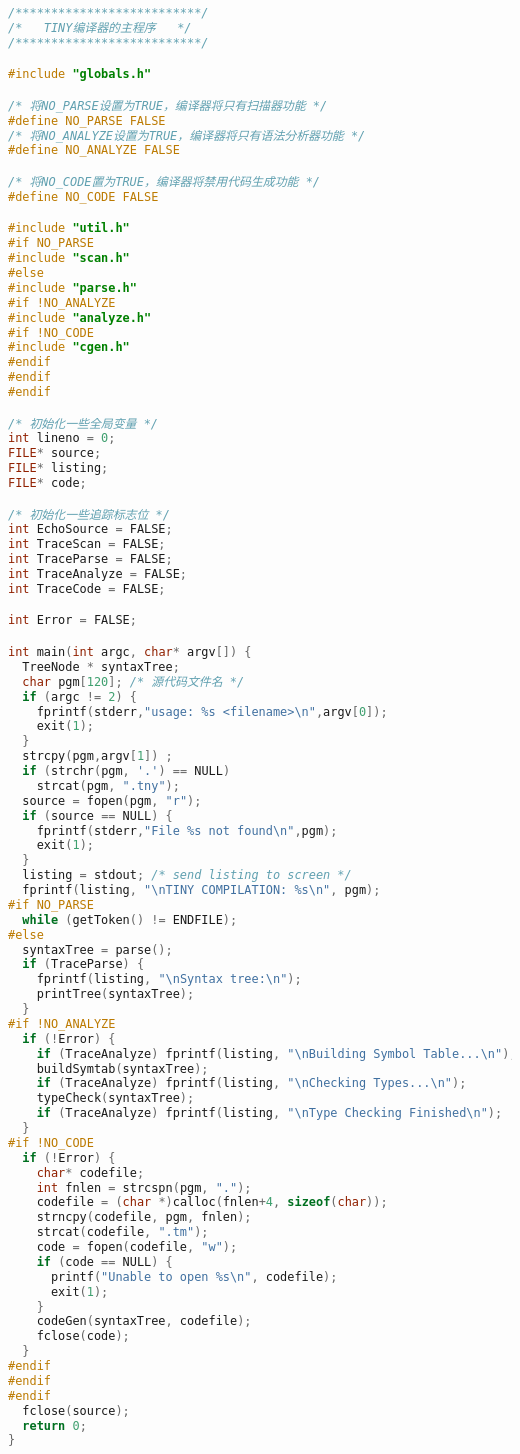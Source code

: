 \documentclass[lang=cn,10pt]{elegantbook}
\begin{document}
\begin{lstlisting}[caption={main.c},language=c]
/**************************/
/*   TINY编译器的主程序   */
/**************************/

#include "globals.h"

/* 将NO_PARSE设置为TRUE，编译器将只有扫描器功能 */
#define NO_PARSE FALSE
/* 将NO_ANALYZE设置为TRUE，编译器将只有语法分析器功能 */
#define NO_ANALYZE FALSE

/* 将NO_CODE置为TRUE，编译器将禁用代码生成功能 */
#define NO_CODE FALSE

#include "util.h"
#if NO_PARSE
#include "scan.h"
#else
#include "parse.h"
#if !NO_ANALYZE
#include "analyze.h"
#if !NO_CODE
#include "cgen.h"
#endif
#endif
#endif

/* 初始化一些全局变量 */
int lineno = 0;
FILE* source;
FILE* listing;
FILE* code;

/* 初始化一些追踪标志位 */
int EchoSource = FALSE;
int TraceScan = FALSE;
int TraceParse = FALSE;
int TraceAnalyze = FALSE;
int TraceCode = FALSE;

int Error = FALSE;

int main(int argc, char* argv[]) {
  TreeNode * syntaxTree;
  char pgm[120]; /* 源代码文件名 */
  if (argc != 2) {
    fprintf(stderr,"usage: %s <filename>\n",argv[0]);
    exit(1);
  }
  strcpy(pgm,argv[1]) ;
  if (strchr(pgm, '.') == NULL)
    strcat(pgm, ".tny");
  source = fopen(pgm, "r");
  if (source == NULL) {
    fprintf(stderr,"File %s not found\n",pgm);
    exit(1);
  }
  listing = stdout; /* send listing to screen */
  fprintf(listing, "\nTINY COMPILATION: %s\n", pgm);
#if NO_PARSE
  while (getToken() != ENDFILE);
#else
  syntaxTree = parse();
  if (TraceParse) {
    fprintf(listing, "\nSyntax tree:\n");
    printTree(syntaxTree);
  }
#if !NO_ANALYZE
  if (!Error) {
    if (TraceAnalyze) fprintf(listing, "\nBuilding Symbol Table...\n");
    buildSymtab(syntaxTree);
    if (TraceAnalyze) fprintf(listing, "\nChecking Types...\n");
    typeCheck(syntaxTree);
    if (TraceAnalyze) fprintf(listing, "\nType Checking Finished\n");
  }
#if !NO_CODE
  if (!Error) {
    char* codefile;
    int fnlen = strcspn(pgm, ".");
    codefile = (char *)calloc(fnlen+4, sizeof(char));
    strncpy(codefile, pgm, fnlen);
    strcat(codefile, ".tm");
    code = fopen(codefile, "w");
    if (code == NULL) {
      printf("Unable to open %s\n", codefile);
      exit(1);
    }
    codeGen(syntaxTree, codefile);
    fclose(code);
  }
#endif
#endif
#endif
  fclose(source);
  return 0;
}
\end{lstlisting}
\end{document}

